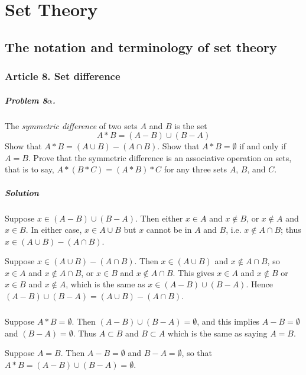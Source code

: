 \chapter{Set Theory}

\section{The notation and terminology of set theory}


\subsection{Article 8. Set difference}

\paragraph{Problem 8$\alpha$.}
The \textit{symmetric difference} of two sets $A$ and $B$ is the set
$$ A*B = (A-B) \cup (B-A) $$
Show that $A*B = (A \cup B) - (A \cap B)$. Show that $A*B = \emptyset$ if and
only if $ A = B$. Prove that the symmetric difference is an associative
operation on sets, that is to say, $A*(B*C) = (A*B)*C$ for any three sets
$A$, $B$, and $C$.

\paragraph*{Solution}
Suppose $ x \in (A-B) \cup (B-A) $. Then either $x \in A$ and $ x \notin B$, or
$ x \notin A$ and $x \in B$. In either case, $x \in A \cup B$ but $x$ cannot
be in $A$ and $B$, i.e. $ x \notin A \cap B$; thus $x \in (A \cup B) - (A \cap B)$.

Suppose $x \in (A \cup B) - (A \cap B)$. Then $ x \in (A \cup B)$ and $x \notin
A \cap B$, so $ x \in A $ and $x \notin A \cap B$, or $ x \in B $ and $x \notin
A \cap B$. This gives $ x \in A $ and $ x \notin B $ or $x \in B $ and $x \notin
A $, which is the same as $x \in (A-B) \cup (B -A)$. Hence $(A-B) \cup (B-A) =
(A \cup B) - (A \cap B)$.

\paragraph{}
Suppose $A*B = \emptyset$. Then $(A-B) \cup (B-A) = \emptyset$, and this implies
$ A-B = \emptyset$ and $(B-A) = \emptyset$. Thus $ A \subset B $ and $ B \subset A$
which is the same as saying $A = B$.

Suppose $A = B$. Then $A - B = \emptyset$ and $B - A = \emptyset$, so that
$A*B = (A-B) \cup (B-A) = \emptyset$.

